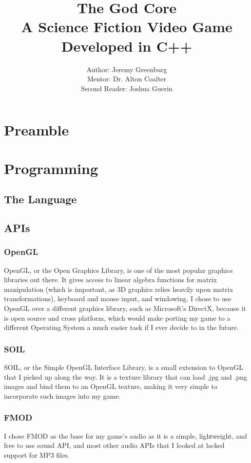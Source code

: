 \documentclass{article}
\author{Author: Jeremy Greenburg \\ Mentor: Dr. Alton Coalter \\ Second Reader: Joshua Guerin}
\title{The God Core \\ A Science Fiction Video Game Developed in C++}
\begin{document}
\maketitle
\pagebreak

\tableofcontents

\pagebreak

\section{Preamble}

\section{Programming}

\subsection{The Language}

\subsection{APIs}

\subsubsection{OpenGL}
OpenGL, or the Open Graphics Library, is one of the most popular graphics libraries out there. It gives access to linear algebra functions for matrix manipulation (which is important, as 3D graphics relies heavily upon matrix transformations), keyboard and mouse input, and windowing. I chose to use OpenGL over a different graphics library, such as Microsoft's DirectX, because it is open source and cross platform, which would make porting my game to a different Operating System a much easier task if I ever decide to in the future.

\subsubsection{SOIL}
SOIL, or the Simple OpenGL Interface Library, is a small extension to OpenGL that I picked up along the way. It is a texture library that can load .jpg and .png images and bind them to an OpenGL texture, making it very simple to incorporate such images into my game.

\subsubsection{FMOD}
I chose FMOD as the base for my game's audio as it is a simple, lightweight, and free to use sound API, and most other audio APIs that I looked at lacked support for MP3 files. 
\end{document}
